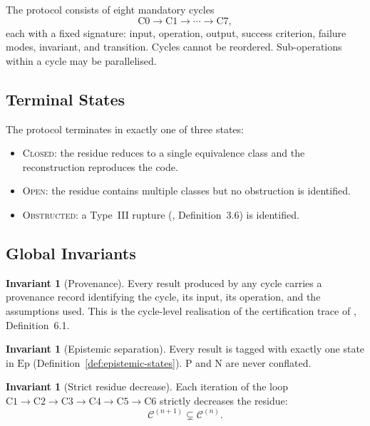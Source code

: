 \documentclass[11pt,a4paper]{article}
\theoremstyle{definition}
\newtheorem{invariant}[definition]{Invariant}
\theoremstyle{plain}
\newcommand{\Ccal}{\mathcal{C}}
\newcommand{\Pmark}{\mathrm{P}}
\newcommand{\Nmark}{\mathrm{N}}
\newcommand{\STCLOSED}{\textsc{Closed}}
\newcommand{\STOPEN}{\textsc{Open}}
\newcommand{\STOBSTR}{\textsc{Obstructed}}
\begin{document}
The protocol consists of eight mandatory cycles
\[
  \mathrm{C0} \to \mathrm{C1} \to \cdots \to \mathrm{C7},
\]
each with a fixed signature: input, operation, output, success
criterion, failure modes, invariant, and transition. Cycles cannot
be reordered. Sub-operations within a cycle may be parallelised.

\subsection{Terminal States}

The protocol terminates in exactly one of three states:

\begin{itemize}
  \item \STCLOSED: the residue reduces to a single equivalence
        class and the reconstruction reproduces the code.
  \item \STOPEN: the residue contains multiple classes but no
        obstruction is identified.
  \item \STOBSTR: a Type~III rupture (\cite{paperII},
        Definition~3.6) is identified.
\end{itemize}

\subsection{Global Invariants}

\begin{invariant}[Provenance]\label{inv:provenance}
Every result produced by any cycle carries a provenance record
identifying the cycle, its input, its operation, and the
assumptions used. This is the cycle-level realisation of the
certification trace of \cite{paperIII}, Definition~6.1.
\end{invariant}

\begin{invariant}[Epistemic separation]\label{inv:epistemic}
Every result is tagged with exactly one state in $\mathrm{Ep}$
(Definition~\ref{def:epistemic-states}). $\Pmark$ and $\Nmark$ are
never conflated.
\end{invariant}

\begin{invariant}[Strict residue decrease]\label{inv:residue}
Each iteration of the loop
$\mathrm{C1} \to \mathrm{C2} \to \mathrm{C3} \to \mathrm{C4}
\to \mathrm{C5} \to \mathrm{C6}$ strictly decreases the residue:
\[
  \Ccal^{(n+1)} \subsetneq \Ccal^{(n)}.
\]
\end{invariant}
\end{document}
